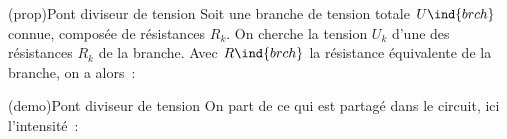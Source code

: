 \documentclass[../../main/main.tex]{subfiles}
\begin{document}
\begin{tcb*}[label=prop:divtens, sidebyside, righthand ratio=.4](prop){Pont
			diviseur de tension}
	Soit une branche de tension totale $U\ind{brch}$ connue, composée de
	résistances $R_k$. On cherche la tension $U_k$ d'une des résistances $R_k$ de
	la branche. Avec $R\ind{brch}$ la résistance équivalente de la branche, on a alors~:
	\psw{%
		\[
			\boxed{U_k = \frac{R_k}{R\ind{brch}}U\ind{brch}}
		\]
	}%
	\vspace{-15pt}
	\tcblower
	\begin{center}
	\end{center}
\end{tcb*}
\begin{tcb*}[label=demo:divtens](demo){Pont diviseur de tension}
	On part de ce qui est partagé dans le circuit, ici l'intensité~:
	\vspace{-15pt}
\end{tcb*}
\end{document}
